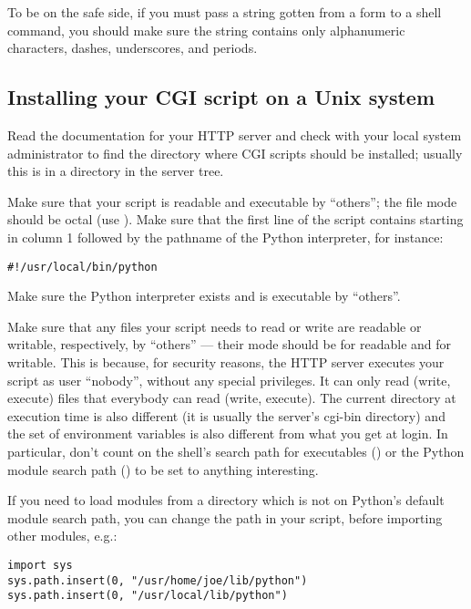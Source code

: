 To be on the safe side, if you must pass a string gotten from a form
to a shell command, you should make sure the string contains only
alphanumeric characters, dashes, underscores, and periods.


\subsection{Installing your CGI script on a Unix system}

Read the documentation for your HTTP server and check with your local
system administrator to find the directory where CGI scripts should be
installed; usually this is in a directory  in the server tree.

Make sure that your script is readable and executable by ``others''; the
\UNIX{} file mode should be  octal (use ).  Make sure that the first line of the script contains
\code{\#!} starting in column 1 followed by the pathname of the Python
interpreter, for instance:

\begin{verbatim}
#!/usr/local/bin/python
\end{verbatim}

Make sure the Python interpreter exists and is executable by ``others''.

Make sure that any files your script needs to read or write are
readable or writable, respectively, by ``others'' --- their mode
should be  for readable and  for writable.  This
is because, for security reasons, the HTTP server executes your script
as user ``nobody'', without any special privileges.  It can only read
(write, execute) files that everybody can read (write, execute).  The
current directory at execution time is also different (it is usually
the server's cgi-bin directory) and the set of environment variables
is also different from what you get at login.  In particular, don't
count on the shell's search path for executables () or
the Python module search path () to be set to
anything interesting.

If you need to load modules from a directory which is not on Python's
default module search path, you can change the path in your script,
before importing other modules, e.g.:

\begin{verbatim}
import sys
sys.path.insert(0, "/usr/home/joe/lib/python")
sys.path.insert(0, "/usr/local/lib/python")
\end{verbatim}


